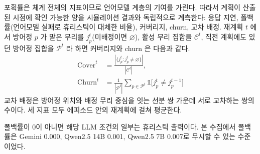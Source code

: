 포획률은 체계 전체의 지표이므로 언어모델 계층의 기여를 가린다. 따라서 계획이 산출된 시점에
확인 가능한 양을 시뮬레이션 결과와 독립적으로 계측한다: 응답 지연, 폴백률(언어모델 실패로
휴리스틱이 대체한 비율), 커버리지, churn, 교차 배정.
재계획 $t$ 에서 방어정 $p$ 가 맡은 무리를 $j^{t}_p$(미배정이면 $\varnothing$), 활성 무리
집합을 $\mathcal{C}^{t}$, 직전 계획에도 있던 방어정 집합을 $\mathcal{P}^{t}$ 라 하면
커버리지와 churn 은 다음과 같다.
\begin{equation}
\begin{aligned}
\mathrm{Cover}^{t} &= \frac{|\{ j^{t}_p : j^{t}_p \neq \varnothing \}|}{|\mathcal{C}^{t}|},\\
\mathrm{Churn}^{t} &= \frac{1}{|\mathcal{P}^{t}|} \sum_{p \in \mathcal{P}^{t}} \mathbb{1}\big[ j^{t}_p \neq j^{t-1}_p \big]
\end{aligned}
\label{eq:churn}
\end{equation}
교차 배정은 방어정 위치와 배정 무리 중심을 잇는 선분 쌍 가운데 서로 교차하는 쌍의 수이다.
세 지표 모두 에피소드 안의 재계획에 걸쳐 평균한다.

폴백률이 0이 아니면 해당 LLM 조건의 일부는 휴리스틱 출력이다. 본 수집에서 폴백률은 Gemini
0.000, Qwen2.5 14B 0.001, Qwen2.5 7B 0.007로 무시할 수 있는 수준이었다.
